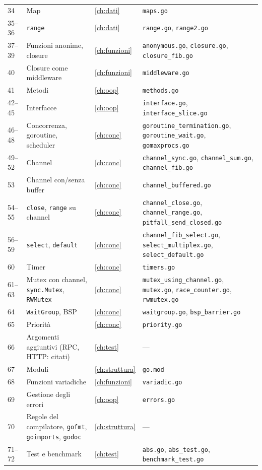 \documentclass[11pt,a4paper]{report}
\newcommand{\cod}[1]{\texttt{#1}}
\begin{document}
\begin{center}
\begin{longtable}{@{}L{1.4cm}L{4.9cm}L{1.2cm}L{6.1cm}@{}}
34 & Map & \ref{ch:dati} & \texttt{maps.go}\\
35--36 & \cod{range} & \ref{ch:dati} & \texttt{range.go}, \texttt{range2.go}\\
37--39 & Funzioni anonime, closure & \ref{ch:funzioni} & \texttt{anonymous.go}, \texttt{closure.go}, \texttt{closure\_fib.go}\\
40 & Closure come middleware & \ref{ch:funzioni} & \texttt{middleware.go}\\
41 & Metodi & \ref{ch:oop} & \texttt{methods.go}\\
42--45 & Interfacce & \ref{ch:oop} & \texttt{interface.go}, \texttt{interface\_slice.go}\\
46--48 & Concorrenza, goroutine, scheduler & \ref{ch:conc} & \texttt{goroutine\_termination.go}, \texttt{goroutine\_wait.go}, \texttt{gomaxprocs.go}\\
49--52 & Channel & \ref{ch:conc} & \texttt{channel\_sync.go}, \texttt{channel\_sum.go}, \texttt{channel\_fib.go}\\
53 & Channel con/senza buffer & \ref{ch:conc} & \texttt{channel\_buffered.go}\\
54--55 & \cod{close}, \cod{range} su channel & \ref{ch:conc} & \texttt{channel\_close.go}, \texttt{channel\_range.go}, \texttt{pitfall\_send\_closed.go}\\
56--59 & \cod{select}, \cod{default} & \ref{ch:conc} & \texttt{channel\_fib\_select.go}, \texttt{select\_multiplex.go}, \texttt{select\_default.go}\\
60 & Timer & \ref{ch:conc} & \texttt{timers.go}\\
61--63 & Mutex con channel, \cod{sync.Mutex}, \cod{RWMutex} & \ref{ch:conc} & \texttt{mutex\_using\_channel.go}, \texttt{mutex.go}, \texttt{race\_counter.go}, \texttt{rwmutex.go}\\
64 & \cod{WaitGroup}, BSP & \ref{ch:conc} & \texttt{waitgroup.go}, \texttt{bsp\_barrier.go}\\
65 & Priorità & \ref{ch:conc} & \texttt{priority.go}\\
66 & Argomenti aggiuntivi (RPC, HTTP: citati) & \ref{ch:test} & ---\\
67 & Moduli & \ref{ch:struttura} & \texttt{go.mod}\\
68 & Funzioni variadiche & \ref{ch:funzioni} & \texttt{variadic.go}\\
69 & Gestione degli errori & \ref{ch:oop} & \texttt{errors.go}\\
70 & Regole del compilatore, \cod{gofmt}, \cod{goimports}, \cod{godoc} & \ref{ch:struttura} & ---\\
71--72 & Test e benchmark & \ref{ch:test} & \texttt{abs.go}, \texttt{abs\_test.go}, \texttt{benchmark\_test.go}\\
\bottomrule
\end{longtable}
\end{center}
\end{document}
